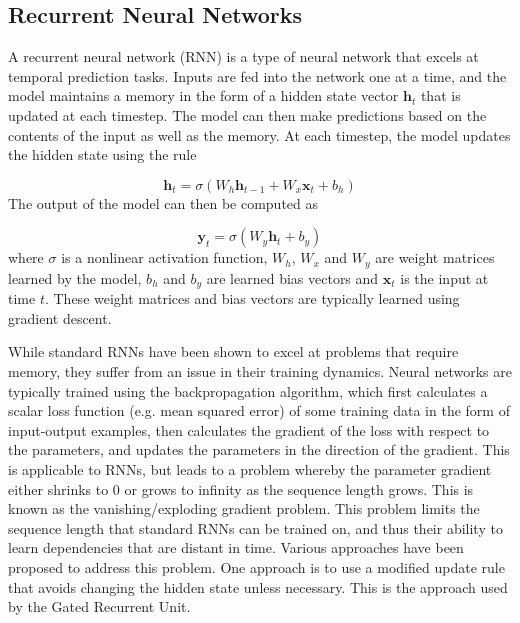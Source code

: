 \subsection*{Recurrent Neural Networks}

A recurrent neural network (RNN) is a type of neural network that excels at temporal prediction tasks. Inputs are fed into the network one at a time, and the model maintains a memory in the form of a hidden state vector \(\mathbf{h}_t\) that is updated at each timestep. The model can then make predictions based on the contents of the input as well as the memory. At each timestep, the model updates the hidden state using the rule

\[ \mathbf{h}_t = \sigma(W_h \mathbf{h}_{t-1} + W_x \mathbf{x}_t + b_h) \]
The output of the model can then be computed as

\[ \mathbf{y}_t = \sigma(W_y \mathbf{h}_t + b_y) \]
where \(\sigma\) is a nonlinear activation function, \(W_h\), \(W_x\) and \(W_y\) are weight matrices learned by the model, \(b_h\) and \(b_y\) are learned bias vectors and \(\mathbf{x}_t\) is the input at time \(t\). These weight matrices and bias vectors are typically learned using gradient descent.

While standard RNNs have been shown to excel at problems that require memory, they suffer from an issue in their training dynamics.
Neural networks are typically trained using the backpropagation algorithm, which first calculates a scalar loss function (e.g. mean squared error) of some training data in the form of input-output examples, then calculates the gradient of the loss with respect to the parameters, and updates the parameters in the direction of the gradient. This is applicable to RNNs, but leads to a problem whereby the parameter gradient either shrinks to 0 or grows to infinity as the sequence length grows. This is known as the vanishing/exploding gradient problem. This problem limits the sequence length that standard RNNs can be trained on, and thus their ability to learn dependencies that are distant in time.
Various approaches have been proposed to address this problem. One approach is to use a modified update rule that avoids changing the hidden state unless necessary. This is the approach used by the Gated Recurrent Unit.